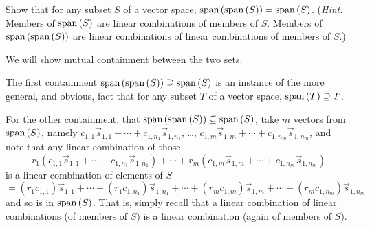 
\begin{Exercise}[
name={},
title={}, 
difficulty=0,
origin={\cite{JH}}]
Show that for any subset \( S \) of a vector space,
    \( \text{span}\left( \text{span}\left(S\right) \right)=\text{span}\left(S\right) \).
    (\textit{Hint.} 
    Members of $\text{span}\left(S\right)$ are linear combinations of members of $S$.
    Members of $\text{span}\left(\text{span}\left(S\right)\right)$ are linear combinations of 
    linear combinations of members of $S$.)
\end{Exercise}

\begin{Answer}
We will show mutual containment between the two sets.

      The first containment \( \text{span}\left( \text{span}\left(S\right) \right)\supseteq\text{span}\left(S\right)  \)
      is an instance of the more general, and obvious, fact that for any 
      subset \( T \) of a vector space, \( \text{span}\left(T\right)\supseteq T \).

      For the other containment, 
      that \( \text{span}\left( \text{span}\left(S\right) \right)\subseteq\text{span}\left(S\right) \),
      take $m$ vectors from \( \text{span}\left(S\right) \), namely
      \( c_{1,1}\vec{s}_{1,1}+\cdots+c_{1,n_1}\vec{s}_{1,n_1} \), \ldots,
      \( c_{1,m}\vec{s}_{1,m}+\cdots+c_{1,n_m}\vec{s}_{1,n_m} \),
      and note that any linear combination of those
      \begin{equation*}
         r_1(c_{1,1}\vec{s}_{1,1}+\cdots+c_{1,n_1}\vec{s}_{1,n_1})+\cdots
        +r_m(c_{1,m}\vec{s}_{1,m}+\cdots+c_{1,n_m}\vec{s}_{1,n_m})
      \end{equation*}
      is a linear combination of elements of \( S \)
      \begin{equation*}
        = (r_1c_{1,1})\vec{s}_{1,1}+\cdots+(r_1c_{1,n_1})\vec{s}_{1,n_1}+\cdots
        +(r_mc_{1,m})\vec{s}_{1,m}+\cdots+(r_mc_{1,n_m})\vec{s}_{1,n_m}
      \end{equation*}
      and so is in \( \text{span}\left(S\right) \).  
      That is, simply recall that a linear combination of linear combinations
      (of members of $S$)
      is a linear combination (again of members of $S$).

\end{Answer}
